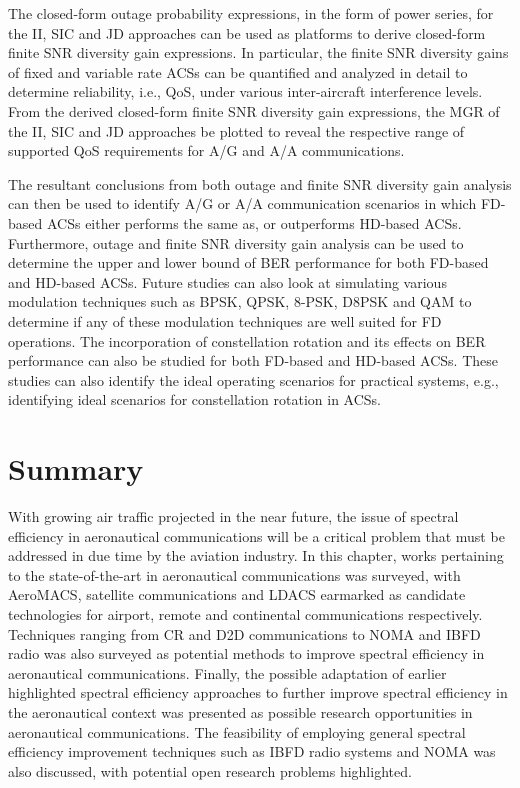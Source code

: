 The closed-form outage probability expressions, in the form of power series, for the II, SIC and JD approaches can be used as platforms to derive closed-form finite SNR diversity gain expressions. In particular, the finite SNR diversity gains of fixed and variable rate ACSs can be quantified and analyzed in detail to determine reliability, i.e., QoS, under various inter-aircraft interference levels. From the derived closed-form finite SNR diversity gain expressions, the MGR of the II, SIC and JD approaches be plotted to reveal the respective range of supported QoS requirements for A/G and A/A communications.

The resultant conclusions from both outage and finite SNR diversity gain analysis can then be used to identify A/G or A/A communication scenarios in which FD-based ACSs either performs the same as, or outperforms HD-based ACSs. Furthermore, outage and finite SNR diversity gain analysis can be used to determine the upper and lower bound of BER performance for both FD-based and HD-based ACSs. Future studies can also look at simulating various modulation techniques such as BPSK, QPSK, 8-PSK, D8PSK and QAM to determine if any of these modulation techniques are well suited for FD operations. The incorporation of constellation rotation and its effects on BER performance can also be studied for both FD-based and HD-based ACSs. These studies can also identify the ideal operating scenarios for practical systems, e.g., identifying ideal scenarios for constellation rotation in ACSs.

\section{Summary}
With growing air traffic projected in the near future, the issue of spectral efficiency in aeronautical communications will be a critical problem that must be addressed in due time by the aviation industry. In this chapter, works pertaining to the state-of-the-art in aeronautical communications was surveyed, with AeroMACS, satellite communications and LDACS earmarked as candidate technologies for airport, remote and continental communications respectively. Techniques ranging from CR and D2D communications to NOMA and IBFD radio was also surveyed as potential methods to improve spectral efficiency in aeronautical communications. Finally, the possible adaptation of earlier highlighted spectral efficiency approaches to further improve spectral efficiency in the aeronautical context was presented as possible research opportunities in aeronautical communications. The feasibility of employing general spectral efficiency improvement techniques such as IBFD radio systems and NOMA was also discussed, with potential open research problems highlighted.




